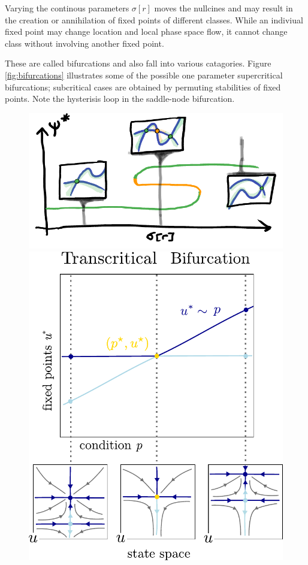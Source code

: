 Varying the continous parameters $\sigma[r]$ moves the nullcines and may result in
the creation or annihilation of fixed points of different classes. While an indiviual
fixed point may change location and local phase space flow, it cannot change class
without involving another fixed point.

These are called bifurcations and also fall into various catagories.
Figure \ref{fig:bifurcations} illustrates some of the possible one parameter
supercritical bifurcations; subcritical cases are obtained by permuting
stabilities of fixed points. Note the hysterisis loop in the saddle-node
bifurcation.
\begin{figure}[H]
\centering{}
\captionsetup{justification=centering}
\includegraphics[scale=0.35]{figures/saddlenode}
\includegraphics[scale=0.35]{figures/transcritical}

\end{figure}
